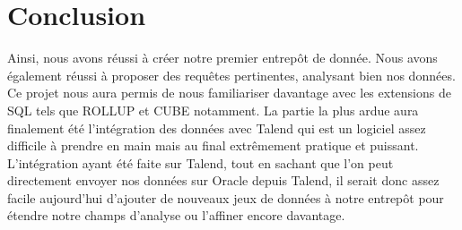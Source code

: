 \documentclass[a4paper,sffamily,12pt]{article}
\begin{document}
		\vspace{0.5cm}
																
	\section{Conclusion}

		\vspace{0.5cm}
		
		Ainsi, nous avons réussi à créer notre premier entrepôt de donnée. Nous avons également réussi à proposer des requêtes pertinentes, analysant bien nos données. Ce projet nous aura permis de nous familiariser davantage avec les extensions de SQL tels que ROLLUP et CUBE notamment. La partie la plus ardue aura finalement été l'intégration des données avec Talend qui est un logiciel assez difficile à prendre en main mais au final extrêmement pratique et puissant. L'intégration ayant été faite sur Talend, tout en sachant que l'on peut directement envoyer nos données sur Oracle depuis Talend, il serait donc assez facile aujourd'hui d'ajouter de nouveaux jeux de données à notre entrepôt pour étendre notre champs d'analyse ou l'affiner encore davantage. \\
						
\end{document}
